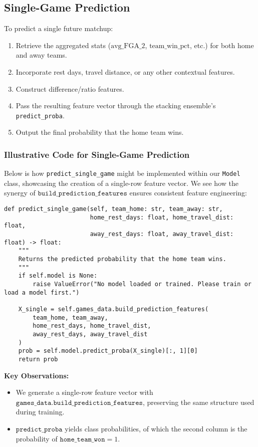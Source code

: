 \documentclass[12pt]{article}
\begin{document}
\subsection{Single-Game Prediction}
To predict a single future matchup:
\begin{enumerate}[label=\roman*)]
    \item Retrieve the aggregated stats (\(\text{avg\_FGA\_2}\), \(\text{team\_win\_pct}\), etc.) for both home and away teams.
    \item Incorporate rest days, travel distance, or any other contextual features.
    \item Construct difference/ratio features.
    \item Pass the resulting feature vector through the stacking ensemble’s \texttt{predict\_proba}.
    \item Output the final probability that the home team wins.
\end{enumerate}

\subsubsection{Illustrative Code for Single-Game Prediction}
Below is how \texttt{predict\_single\_game} might be implemented within our \texttt{Model} class, showcasing the creation of a single-row feature vector. We see how the synergy of \(\texttt{build\_prediction\_features}\) ensures consistent feature engineering:

\begin{verbatim}
def predict_single_game(self, team_home: str, team_away: str,
                        home_rest_days: float, home_travel_dist: float,
                        away_rest_days: float, away_travel_dist: float) -> float:
    """
    Returns the predicted probability that the home team wins.
    """
    if self.model is None:
        raise ValueError("No model loaded or trained. Please train or load a model first.")

    X_single = self.games_data.build_prediction_features(
        team_home, team_away,
        home_rest_days, home_travel_dist,
        away_rest_days, away_travel_dist
    )
    prob = self.model.predict_proba(X_single)[:, 1][0]
    return prob
\end{verbatim}

\noindent
\textbf{Key Observations:}
\begin{itemize}
    \item We generate a single-row feature vector with \(\texttt{games\_data.build\_prediction\_features}\), preserving the same structure used during training.
    \item \(\texttt{predict\_proba}\) yields class probabilities, of which the second column is the probability of \(\texttt{home\_team\_won} = 1\).
\end{itemize}
\end{document}
